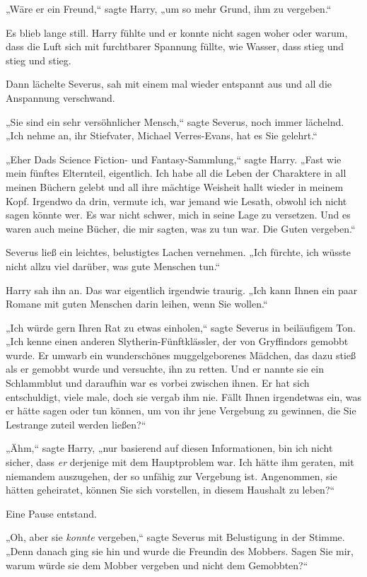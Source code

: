 {„Wäre er ein Freund,“ sagte Harry, „um so mehr Grund, ihm zu vergeben.“

Es blieb lange still. Harry fühlte und er konnte nicht sagen woher oder warum, dass die Luft sich mit furchtbarer Spannung füllte, wie Wasser, dass stieg und stieg und stieg.

Dann lächelte Severus, sah mit einem mal wieder entspannt aus und all die Anspannung verschwand.

„Sie sind ein sehr versöhnlicher Mensch,“ sagte Severus, noch immer lächelnd. „Ich nehme an, ihr Stiefvater, Michael Verres-Evans, hat es Sie gelehrt.“

„Eher Dads Science Fiction- und Fantasy-Sammlung,“ sagte Harry. „Fast wie mein fünftes Elternteil, eigentlich. Ich habe all die Leben der Charaktere in all meinen Büchern gelebt und all ihre mächtige Weisheit hallt wieder in meinem Kopf. Irgendwo da drin, vermute ich, war jemand wie Lesath, obwohl ich nicht sagen könnte wer. Es war nicht schwer, mich in seine Lage zu versetzen. Und es waren auch meine Bücher, die mir sagten, was zu tun war. Die Guten vergeben.“

Severus ließ ein leichtes, belustigtes Lachen vernehmen. „Ich fürchte, ich wüsste nicht allzu viel darüber, was gute Menschen tun.“

Harry sah ihn an. Das war eigentlich irgendwie traurig. „Ich kann Ihnen ein paar Romane mit guten Menschen darin leihen, wenn Sie wollen.“

„Ich würde gern Ihren Rat zu etwas einholen,“ sagte Severus in beiläufigem Ton. „Ich kenne einen anderen Slytherin-Fünftklässler, der von Gryffindors gemobbt wurde. Er umwarb ein wunderschönes muggelgeborenes Mädchen, das dazu stieß als er gemobbt wurde und versuchte, ihn zu retten. Und er nannte sie ein Schlammblut und daraufhin war es vorbei zwischen ihnen. Er hat sich entschuldigt, viele male, doch sie vergab ihm nie. Fällt Ihnen irgendetwas ein, was er hätte sagen oder tun können, um von ihr jene Vergebung zu gewinnen, die Sie Lestrange zuteil werden ließen?“

„Ähm,“ sagte Harry, „nur basierend auf diesen Informationen, bin ich nicht sicher, dass \emph{er} derjenige mit dem Hauptproblem war. Ich hätte ihm geraten, mit niemandem auszugehen, der so unfähig zur Vergebung ist. Angenommen, sie hätten geheiratet, können Sie sich vorstellen, in diesem Haushalt zu leben?“

Eine Pause entstand.

„Oh, aber sie \emph{konnte} vergeben,“ sagte Severus mit Belustigung in der Stimme. „Denn danach ging sie hin und wurde die Freundin des Mobbers. Sagen Sie mir, warum würde sie dem Mobber vergeben und nicht dem Gemobbten?“

}
